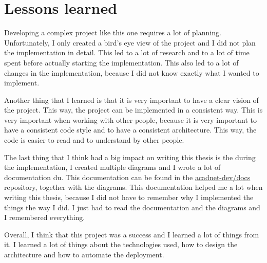 \documentclass[12pt,a4paper]{report}
\begin{document}
\section{Lessons learned}
Developing a complex project like this one requires a lot of planning. Unfortunately, I only created a bird's eye view of the project and I did not plan the implementation in detail. This led to a lot of research and to a lot of time spent before actually starting the implementation. This also led to a lot of changes in the implementation, because I did not know exactly what I wanted to implement. 

Another thing that I learned is that it is very important to have a clear vision of the project. This way, the project can be implemented in a consistent way. This is very important when working with other people, because it is very important to have a consistent code style and to have a consistent architecture. This way, the code is easier to read and to understand by other people.

The last thing that I think had a big impact on writing this thesis is the during the implementation, I created multiple diagrams and I wrote a lot of documentation du. This documentation can be found in the \href{https://github.com/acadnet-dev/docs}{acadnet-dev/docs} repository, together with the diagrams. This documentation helped me a lot when writing this thesis, because I did not have to remember why I implemented the things the way I did. I just had to read the documentation and the diagrams and I remembered everything.

Overall, I think that this project was a success and I learned a lot of things from it. I learned a lot of things about the technologies used, how to design the architecture and how to automate the deployment.




\end{document}
